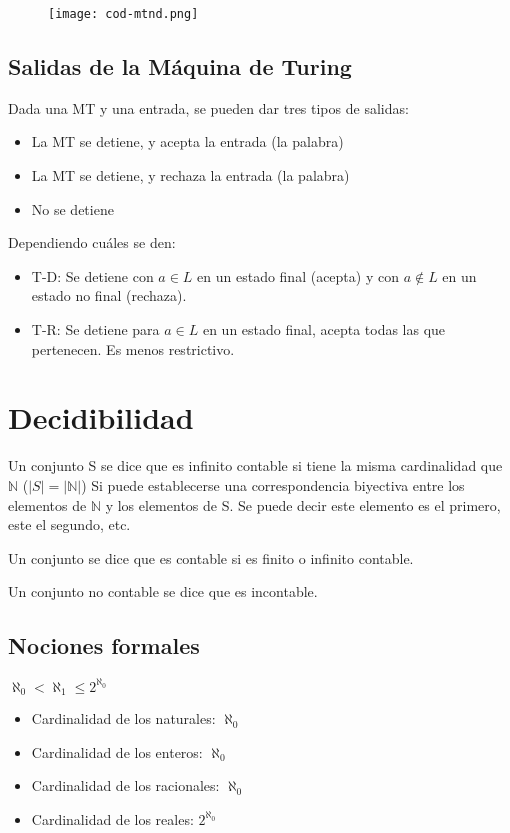 \begin{figure}[H]
    {\texttt{[image: cod-mtnd.png]}}
\end{figure}

\subsection{Salidas de la Máquina de Turing}
Dada una MT y una entrada, se pueden dar tres tipos de salidas:
\begin{itemize}
    \item La MT se detiene, y acepta la entrada (la palabra)
    \item La MT se detiene, y rechaza la entrada (la palabra)
    \item No se detiene
\end{itemize}

Dependiendo cuáles se den:
\begin{itemize}
    \item T-D: Se detiene con $a \in L$ en un estado final (acepta) y con $a \notin L$ en un estado no final (rechaza).
    \item T-R: Se detiene para $a \in L$ en un estado final, acepta todas las que pertenecen. Es menos restrictivo.
\end{itemize}

\section{Decidibilidad}
Un conjunto S se dice que es infinito contable si tiene la misma cardinalidad que $\mathbb{N}$ ($|S|=|\mathbb{N}|$) Si puede establecerse una correspondencia biyectiva entre los elementos de $\mathbb{N}$ y los elementos de S. Se puede decir este elemento es el primero, este el segundo, etc.

Un conjunto se dice que es contable si es finito o infinito contable.

Un conjunto no contable se dice que es incontable.

\subsection{Nociones formales}
$\aleph_0 < \aleph_1 \leq 2^{\aleph_0}$
\begin{itemize}
    \item Cardinalidad de los naturales: $\aleph_0$
    \item Cardinalidad de los enteros: $\aleph_0$
    \item Cardinalidad de los racionales: $\aleph_0$
    \item Cardinalidad de los reales: $2^{\aleph_0}$
\end{itemize}

